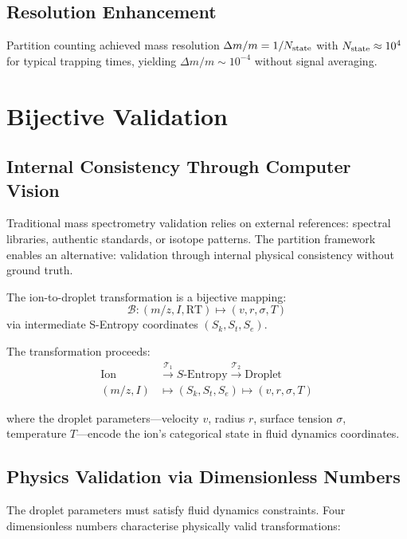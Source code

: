 \subsection{Resolution Enhancement}

Partition counting achieved mass resolution $\Delta m/m = 1/N_{\mathrm{state}}$ with $N_{\mathrm{state}} \approx 10^4$ for typical trapping times, yielding $\Delta m/m \sim 10^{-4}$ without signal averaging.

\section{Bijective Validation}
\label{sec:bijective}

\subsection{Internal Consistency Through Computer Vision}

Traditional mass spectrometry validation relies on external references: spectral libraries, authentic standards, or isotope patterns. The partition framework enables an alternative: validation through internal physical consistency without ground truth.

\begin{definition}
The ion-to-droplet transformation is a bijective mapping:
\begin{equation}
    \mathcal{B}: (m/z, I, \text{RT}) \mapsto (v, r, \sigma, T)
\end{equation}
via intermediate S-Entropy coordinates $(S_k, S_t, S_e)$.
\end{definition}

The transformation proceeds:
\begin{align}
    \text{Ion} &\xrightarrow{\mathcal{T}_1} S\text{-Entropy} \xrightarrow{\mathcal{T}_2} \text{Droplet} \\
    (m/z, I) &\mapsto (S_k, S_t, S_e) \mapsto (v, r, \sigma, T)
\end{align}

where the droplet parameters---velocity $v$, radius $r$, surface tension $\sigma$, temperature $T$---encode the ion's categorical state in fluid dynamics coordinates.

\subsection{Physics Validation via Dimensionless Numbers}

The droplet parameters must satisfy fluid dynamics constraints. Four dimensionless numbers characterise physically valid transformations:

